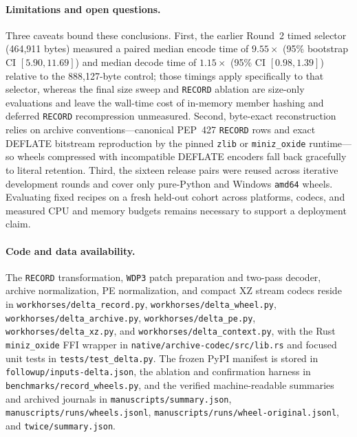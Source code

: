 \documentclass[10pt,letterpaper]{article}
\theoremstyle{remark}
\begin{document}
\paragraph{Limitations and open questions.}
Three caveats bound these conclusions. First, the earlier Round~2 timed selector (464,911 bytes) measured a paired median encode time of $9.55\times$ (95\% bootstrap CI $[5.90, 11.69]$) and median decode time of $1.15\times$ (95\% CI $[0.98, 1.39]$) relative to the 888,127-byte control; those timings apply specifically to that selector, whereas the final size sweep and \texttt{RECORD} ablation are size-only evaluations and leave the wall-time cost of in-memory member hashing and deferred \texttt{RECORD} recompression unmeasured. Second, byte-exact reconstruction relies on archive conventions---canonical PEP~427 \texttt{RECORD} rows and exact DEFLATE bitstream reproduction by the pinned \texttt{zlib} or \texttt{miniz\_oxide} runtime---so wheels compressed with incompatible DEFLATE encoders fall back gracefully to literal retention. Third, the sixteen release pairs were reused across iterative development rounds and cover only pure-Python and Windows \texttt{amd64} wheels. Evaluating fixed recipes on a fresh held-out cohort across platforms, codecs, and measured CPU and memory budgets remains necessary to support a deployment claim.

\paragraph{Code and data availability.}
The \texttt{RECORD} transformation, \texttt{WDP3} patch preparation and two-pass decoder, archive normalization, PE normalization, and compact XZ stream codecs reside in \nolinkurl{workhorses/delta_record.py}, \nolinkurl{workhorses/delta_wheel.py}, \nolinkurl{workhorses/delta_archive.py}, \nolinkurl{workhorses/delta_pe.py}, \nolinkurl{workhorses/delta_xz.py}, and \nolinkurl{workhorses/delta_context.py}, with the Rust \texttt{miniz\_oxide} FFI wrapper in \nolinkurl{native/archive-codec/src/lib.rs} and focused unit tests in \nolinkurl{tests/test_delta.py}. The frozen PyPI manifest is stored in \nolinkurl{followup/inputs-delta.json}, the ablation and confirmation harness in \nolinkurl{benchmarks/record_wheels.py}, and the verified machine-readable summaries and archived journals in \nolinkurl{manuscripts/summary.json}, \nolinkurl{manuscripts/runs/wheels.jsonl}, \nolinkurl{manuscripts/runs/wheel-original.jsonl}, and \nolinkurl{twice/summary.json}.
\end{document}
